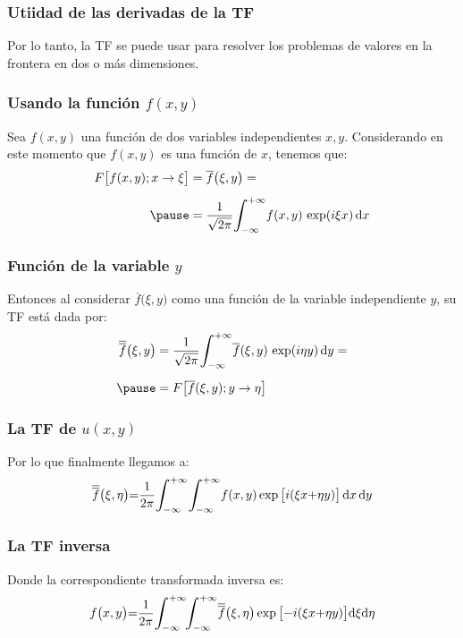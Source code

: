 \documentclass[12pt]{beamer}
\begin{document}
\begin{frame}
\frametitle{Utiidad de las derivadas de la TF}
Por lo tanto, la TF se puede usar para resolver los problemas de valores en la frontera en dos o más dimensiones.
\end{frame}
\begin{frame}
\frametitle{Usando la función $f(x, y)$}
Sea $f (x, y)$ una función de dos variables independientes $x, y$. \pause Considerando en este momento que $f (x, y)$ es una función de $x$, tenemos que:
\pause
\begin{eqnarray*}
\begin{aligned}
F \big[ f(x, y); x \to \xi \big] &= \overline{f} \big( \xi, y \big) = \\[0.5em] \pause
&= \dfrac{1}{\sqrt{2 \pi}} \scaleint{6ex}_{\bs -\infty}^{+\infty} f(x, y) \, \exp(i \xi x) \dd{x}
\end{aligned}
\end{eqnarray*}
\end{frame}
\begin{frame}
\frametitle{Función de la variable $y$}
Entonces al considerar $\overline{f} \big( \xi, y \big)$ como una función de la variable independiente $y$, su TF está dada por:
\pause
\begin{eqnarray*}
\begin{aligned}
\overline{\overline{f}} \big( \xi, y \big) &= \dfrac{1}{\sqrt{2 \pi}} \scaleint{6ex}_{\bs -\infty}^{+\infty} \overline{f} (\xi, y) \, \exp(i \eta y) \dd{y} = \\[0.5em] \pause
&= F \big[ \overline{f} (\xi, y); y \to \eta \big]
\end{aligned}
\end{eqnarray*}
\end{frame}
\begin{frame}
\frametitle{La TF de $u(x, y)$}
Por lo que finalmente llegamos a:
\pause
\begin{align*}
\overline{\overline{f}} \big( \xi, \eta \big) {=} \dfrac{1}{2 \pi} \scaleint{6ex}_{\bs -\infty}^{+\infty} \scaleint{6ex}_{\bs -\infty}^{+\infty} f (x, y) \exp\big[ i (\xi x {+} \eta y) \big] \dd{x} \dd{y}
\end{align*}
\end{frame}
\begin{frame}
\frametitle{La TF inversa}
Donde la correspondiente transformada inversa es:
\pause
\begin{align*}
f \big( x, y \big) {=} \dfrac{1}{2 \pi} \scaleint{6ex}_{\bs -\infty}^{+\infty} \! \scaleint{6ex}_{\bs -\infty}^{+\infty} \overline{\overline{f}} \big( \xi, \eta \big)  \exp\big[ {-}i (\xi x {+} \eta y) \big] \! \dd{\xi} \! \dd{\eta}
\end{align*}
\end{frame}
\end{document}
